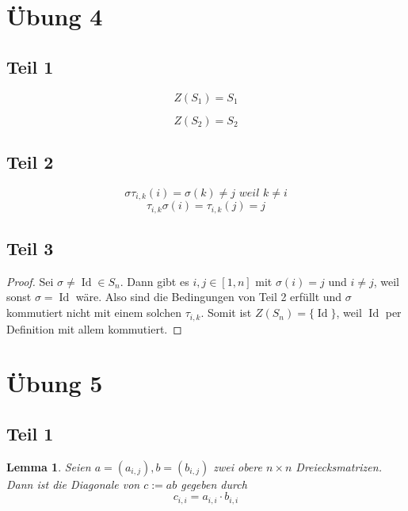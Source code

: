 \documentclass[10pt,a4paper]{article}
\DeclareMathOperator{\id}{Id}
\newtheorem{lemma}{Lemma}
\begin{document}
\section{Übung 4}

\subsection{Teil 1}

\begin{equation}
  Z(S_{1}) = S_{1}
\end{equation}

\begin{equation}
  Z(S_{2}) = S_{2}
\end{equation}

\subsection{Teil 2}

\begin{equation}
  \sigma \tau_{i, k}(i) = \sigma(k) \ne j \textit{ weil $k \ne i$}
\end{equation}
\begin{equation}
  \tau_{i, k} \sigma(i) = \tau_{i, k}(j) = j
\end{equation}

\subsection{Teil 3}

\begin{proof}
  Sei $\sigma \ne \id \in S_{n}$.
  Dann gibt es $i, j \in [1, n]$ mit $\sigma(i) = j$ und $i \ne j$, weil sonst $\sigma = \id$ wäre.
  Also sind die Bedingungen von Teil 2 erfüllt und $\sigma$ kommutiert nicht mit einem solchen $\tau_{i, k}$.
  Somit ist $Z(S_{n}) = \{ \id \}$, weil $\id$ per Definition mit allem kommutiert.
\end{proof}

\section{Übung 5}

\subsection{Teil 1}

\begin{lemma}
  Seien $a = (a_{i, j}), b = (b_{i, j})$ zwei obere $n \times n$ Dreiecksmatrizen.
  Dann ist die Diagonale von $c := ab$ gegeben durch
  \begin{equation}
    c_{i, i} = a_{i, i} \cdot b_{i, i}
  \end{equation}
\end{lemma}
\end{document}
